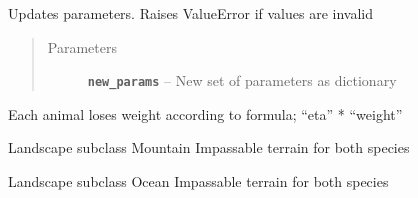 \documentclass[a4paper,10pt,openany,oneside]{sphinxmanual}
\begin{document}
\begin{fulllineitems}
\begin{fulllineitems}
\begin{quote}
\begin{description}
\end{description}\end{quote}

\end{fulllineitems}


\begin{fulllineitems}
\label{landscape:biosim.landscape.Landscape.set_parameters}
Updates parameters. Raises ValueError if values are invalid
\begin{quote}\begin{description}
\item[{Parameters}] \leavevmode
\textbf{\texttt{new\_params}} -- New set of parameters as dictionary

\end{description}\end{quote}

\end{fulllineitems}


\begin{fulllineitems}
\label{landscape:biosim.landscape.Landscape.weightloss_cycle}
Each animal loses weight according to formula; ``eta'' * ``weight''

\end{fulllineitems}


\end{fulllineitems}


\begin{fulllineitems}
\label{landscape:biosim.landscape.Mountain}
Landscape subclass Mountain
Impassable terrain for both species

\end{fulllineitems}


\begin{fulllineitems}
\label{landscape:biosim.landscape.Ocean}
Landscape subclass Ocean
Impassable terrain for both species

\end{fulllineitems}
\end{document}
